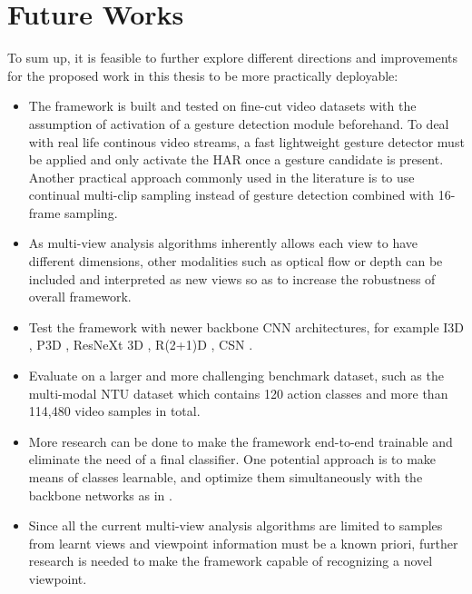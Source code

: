 
\section{Future Works} \label{sec:future_works}


    To sum up, it is feasible to further explore different directions and improvements for the proposed work in this thesis to be more practically deployable:
    \begin{itemize}
        \item The framework is built and tested on fine-cut video datasets with the assumption of activation of a gesture detection module beforehand. To deal with real life continous video streams, a fast lightweight gesture detector must be applied and only activate the HAR once a gesture candidate is present. Another practical approach commonly used in the literature is to use continual multi-clip sampling instead of gesture detection combined with 16-frame sampling.
        \item As multi-view analysis algorithms inherently allows each view to have different dimensions, other modalities such as optical flow or depth can be included and interpreted as new views so as to increase the robustness of overall framework.
        \item Test the framework with newer backbone CNN architectures, for example I3D \cite{joao2017quo}, P3D \cite{qiu2017learning}, ResNeXt 3D \cite{hara2018can}, R(2+1)D \cite{du2018a}, CSN \cite{du2019video}.
        \item Evaluate on a larger and more challenging benchmark dataset, such as the multi-modal NTU dataset \cite{shahroudy2016ntu} which contains 120 action classes and more than 114,480 video samples in total.
        \item More research can be done to make the framework end-to-end trainable and eliminate the need of a final classifier. One potential approach is to make means of classes learnable, and optimize them simultaneously with the backbone networks as in \cite{wen2016a}.
        \item Since all the current multi-view analysis algorithms are limited to samples from learnt views and viewpoint information must be a known priori, further research is needed to make the framework capable of recognizing a novel viewpoint.
    \end{itemize}
